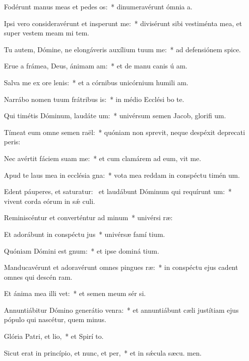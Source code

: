 \item Fodérunt manus meas et pedes os:~* dinumeravérunt ómnia  a.
\item Ipsi vero consideravérunt et insperunt me:~* divisérunt sibi vestiménta mea, et super vestem meam mi tem.
\item Tu autem, Dómine, ne elongáveris auxílium tuum  me:~* ad defensiónem  spice.
\item Erue a frámea, Deus, ánimam am:~* et de manu canis ú am.
\item Salva me ex ore lenis:~* et a córnibus unicórnium humili am.
\item Narrábo nomen tuum frátribus is:~* in médio Ecclési bo te.
\item Qui timétis Dóminum, laudáte um:~* univérsum semen Jacob, glorifi um.
\item Tímeat eum omne semen raël:~* quóniam non sprevit, neque despéxit deprecati peris:
\item Nec avértit fáciem suam  me:~* et cum clamárem ad eum, vit me.
\item Apud te laus mea in ecclésia gna:~* vota mea reddam in conspéctu timén um.
\item Edent páuperes, et saturatur:~\pscross{} et laudábunt Dóminum qui requírunt um:~* vivent corda eórum in sǽ culi.
\item Reminiscéntur et converténtur ad minum~* univérsi  ræ:
\item Et adorábunt in conspéctu jus~* univérsæ famí tium.
\item Quóniam Dómini est gnum:~* et ipse dominá tium.
\item Manducavérunt et adoravérunt omnes pingues ræ:~* in conspéctu ejus cadent omnes qui descén  ram.
\item Et ánima mea illi vet:~* et semen meum sér si.
\item Annuntiábitur Dómino generátio venra:~* et annuntiábunt cæli justítiam ejus pópulo qui nascétur, quem  minus.
\item Glória Patri, et lio,~* et Spirí to.
\item Sicut erat in princípio, et nunc, et per,~* et in sǽcula sæcu. men.
